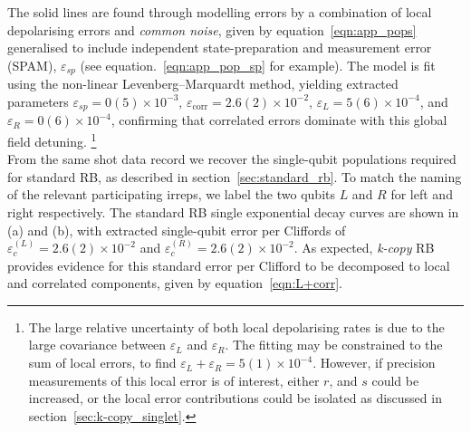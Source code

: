 The solid lines are found through modelling errors by a combination of local depolarising errors and \emph{common noise}, given by equation~\ref{eqn:app_pops} generalised to include independent state-preparation and measurement error (SPAM), $\varepsilon_{sp}$ (see equation.~\ref{eqn:app_pop_sp} for example). 
The model is fit using the non-linear Levenberg–Marquardt method, yielding
extracted parameters
$\varepsilon_{sp}=0(5)\times10^{-3}$, $\varepsilon_\mathrm{corr}=2.6(2)\times10^{-2}$, $\varepsilon_L=5(6)\times10^{-4}$, and
$\varepsilon_R=0(6)\times10^{-4}$, confirming that correlated errors dominate with this global field detuning. 
\footnote{The large relative uncertainty of both local depolarising rates is due to the large covariance between $\varepsilon_L$ and $\varepsilon_R$. The fitting may be constrained to the sum of local errors, to find $\varepsilon_L + \varepsilon_R = 5(1)\times10^{-4}$. However, 
if precision measurements of this local error is of interest, either $r$, and $s$ could be increased, or the local error contributions could be isolated as discussed in section~\ref{sec:k-copy_singlet}.}\\
From the same shot data record we recover the single-qubit populations required for standard RB, as described in section~\ref{sec:standard_rb}. To match the naming of the relevant participating irreps, we label the two qubits $L$ and $R$ for left and right respectively. 
The standard RB single exponential decay curves are shown in (a) and (b), with extracted single-qubit error per Cliffords of $\varepsilon_c^{(L)} = 2.6(2)\times10^{-2} $ and $\varepsilon_c^{(R)}=2.6(2)\times10^{-2}$. As expected, \emph{k-copy} RB provides evidence for this standard error per Clifford to be decomposed to local and correlated components, given by equation~\ref{eqn:L+corr}.

